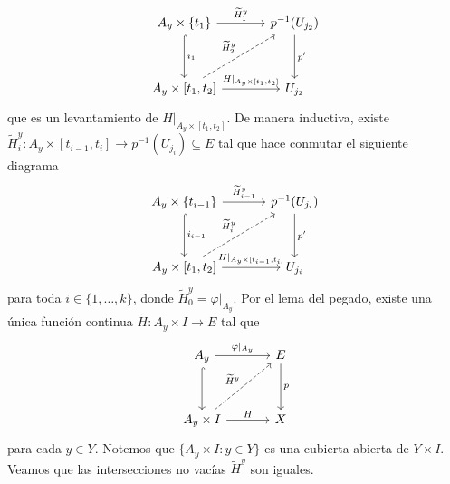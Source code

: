 \begin{dem}
    \begin{equation*}
        \begin{tikzcd}[column sep=1.2cm, row sep =1.2cm]
            A_y\times\{t_1\}\arrow["\widetilde{H}^{y}_1",r]\arrow[d,hook,"i_1"] & p^{-1}(U_{j_2})\arrow["p'",d]\\
            A_y\times[t_1,t_2]\arrow[r,"H|_{A_y\times [t_1,t_2]}"]\arrow[ur, "\widetilde{H}_2^y", dashed] & U_{j_2}
        \end{tikzcd}
    \end{equation*}
    que es un levantamiento de $H|_{A_y\times [t_1,t_2]}$. De manera inductiva, existe $\widetilde{H}_i^y:A_y\times [t_{i-1},t_i]\to p^{-1}(U_{j_i})\subseteq E$ tal que hace conmutar el siguiente diagrama 
    \begin{equation*}
        \begin{tikzcd}[column sep=1.2cm, row sep =1.2cm]
            A_y\times\{t_{i-1}\}\arrow["\widetilde{H}^{y}_{i-1}",r]\arrow[d,hook,"i_{i-1}"] & p^{-1}(U_{j_i})\arrow["p'",d]\\
            A_y\times[t_1,t_2]\arrow[r,"H|_{A_y\times [t_{i-1},t_i]}"]\arrow[ur, "\widetilde{H}_i^y", dashed] & U_{j_i}
        \end{tikzcd}
    \end{equation*}
    para toda $i\in\{1,\ldots, k\}$, donde $\widetilde{H}^{y}_{0}=\varphi|_{A_y}$. Por el lema del pegado, existe una única función continua $\widetilde{H}:A_y\times I\to E$  tal que 
    \begin{equation*}
    \begin{tikzcd}[column sep=1.2cm, row sep =1.2cm]
        A_y\arrow[r,"\varphi|_{A_y}"]\arrow[d,hook] & E\arrow[d,"p"]\\
        A_{y}\times I\arrow[r,"H"]\arrow[ur,"\widetilde{H}^y",dashed] & X
    \end{tikzcd}
    \end{equation*}
    para cada $y\in Y$. Notemos que $\{A_y\times I:y\in Y\}$ es una cubierta abierta de $Y\times I$. Veamos que las intersecciones no vacías $\widetilde{H}^y$ son iguales.


\end{dem}
